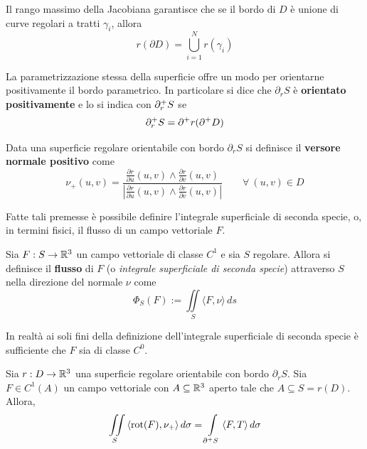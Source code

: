  \begin{oss}
     Il rango massimo della Jacobiana garantisce che se il bordo di $D$ è unione di curve regolari a tratti $\gamma_i$, allora
     \begin{equation*}
         r(\partial D)= \bigcup_{i=1}^N r(\gamma_i)
     \end{equation*}
 \end{oss}
 \begin{oss}
     La parametrizzazione stessa della superficie offre un modo per orientarne positivamente il bordo parametrico. In particolare si dice che $\partial_r S$ è \textbf{orientato positivamente} e lo si indica con $\partial^+_r S$ se
     \begin{equation*}
         \partial^+_r S = \partial^+ r( \partial^+ D)
     \end{equation*}
 \end{oss}
 \begin{definition} \label{Def: Versore normale positivo}
     Data una superficie regolare orientabile con bordo $\partial_r S$ si definisce il \textbf{versore normale positivo} come
     \begin{equation*}
         \nu_+(u,v) = \frac{\frac{\partial r}{\partial u} (u,v) \wedge \frac{\partial r}{\partial v}(u,v)}{\left|\frac{\partial r}{\partial u}(u,v) \wedge \frac{\partial r}{\partial v}(u,v)\right|} \qquad \forall\ (u,v) \in D
     \end{equation*}
 \end{definition}
 Fatte tali premesse è possibile definire l'integrale superficiale di seconda specie, o, in termini fisici, il flusso di un campo vettoriale $F$.
 \begin{definition} \label{Def: Integrale superficiale di seconda specie}
     Sia $F: S \to \mathbb{R}^3$ un campo vettoriale di classe $C^1$ e sia $S$ regolare. Allora si definisce il \textbf{flusso} di $F$ (o \textit{integrale superficiale di seconda specie}) attraverso $S$ nella direzione del normale $\nu$ come
     \begin{equation*}
         \Phi_S(F) := \iint\limits_S{\langle F, \nu \rangle}\, ds
     \end{equation*}
 \end{definition}
 \begin{oss}
     In realtà ai soli fini della definizione dell'integrale superficiale di seconda specie è sufficiente che $F$ sia di classe $C^0$.
 \end{oss}
  \begin{theorem} \label{Teo: Teorema di Stokes}
     Sia $r: D \to \mathbb{R}^3$ una superficie regolare orientabile con bordo $\partial_r S$. Sia $F \in C^1(A)$ un campo vettoriale con $A \subseteq \mathbb{R}^3$ aperto tale che $A \subseteq S=r(D)$. Allora,
     \begin{equation*}
         \iint\limits_{S} {\langle \operatorname{rot}(F), \nu_+ \rangle}\, d\sigma = \int\limits_{\partial^+ S}{\langle F, T \rangle}\, d\sigma
     \end{equation*}
 \end{theorem}
